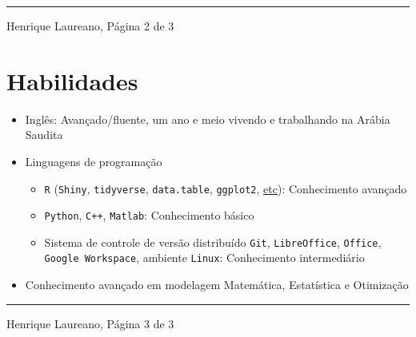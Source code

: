 \documentclass[12pt]{article}
\newcommand{\horrule}[1]{\noindent\rule{\linewidth}{#1}}
\begin{document}
\vspace{\fill}
\horrule{1pt}
\noindent Henrique Laureano, \hfill P\'{a}gina 2 de 3

\section*{Habilidades}

\begin{itemize}
 \item Ingl\^{e}s: Avan\c{c}ado/fluente, um ano e meio vivendo e
       trabalhando na Ar\'{a}bia Saudita
 \item Linguagens de programa\c{c}\~{a}o
  \begin{itemize}
   \item \texttt{R} (\texttt{Shiny}, \texttt{tidyverse},
     \texttt{data.table}, \texttt{ggplot2},
     \href{https://henriquelaureano.github.io/visualizations/}{\color{blue}etc}):
     Conhecimento avan\c{c}ado
   \item \texttt{Python}, \texttt{C++}, \texttt{Matlab}: Conhecimento
          b\'{a}sico
   \item Sistema de controle de vers\~{a}o distribu\'{i}do \texttt{Git},
         \texttt{LibreOffice}, \texttt{Office},
         \texttt{Google Workspace}, ambiente \texttt{Linux}:
         Conhecimento intermedi\'{a}rio
  \end{itemize}
 \item Conhecimento avan\c{c}ado em modelagem Matem\'{a}tica,
       Estat\'{i}stica e Otimiza\c{c}\~{a}o
\end{itemize}

\vspace{\fill}
\horrule{1pt}
\noindent Henrique Laureano, \hfill P\'{a}gina 3 de 3
\end{document}
